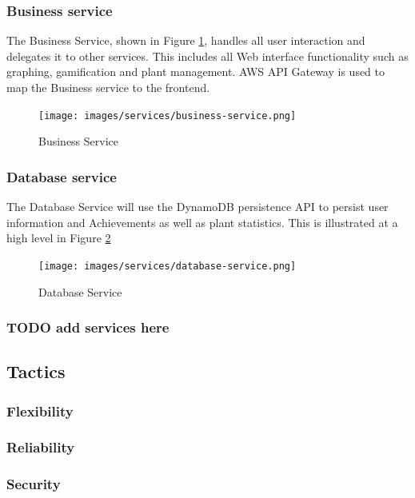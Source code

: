 \documentclass{article}
\begin{document}
\subsubsection{Business service}
The Business Service, shown in Figure \ref{fig:business-service}, handles all user interaction and delegates it to other services. This includes all Web interface functionality such as graphing, gamification and plant management. AWS API Gateway is used to map the Business service to the frontend.

\begin{figure}[h!]
  \texttt{[image: images/services/business-service.png]}
  \caption{Business Service}
  \label{fig:business-service}
\end{figure}

\subsubsection{Database service} \label{sec:database-service}
The Database Service will use the DynamoDB persistence API to persist user information and Achievements as well as plant statistics. This is illustrated at a high level in Figure \ref{fig:database-service}

\begin{figure}[h!]
  \texttt{[image: images/services/database-service.png]}
  \caption{Database Service}
  \label{fig:database-service}
\end{figure}

\subsubsection{TODO add services here}

\subsection{Tactics}

\subsubsection{Flexibility}

\subsubsection{Reliability}

\subsubsection{Security}
\end{document}

